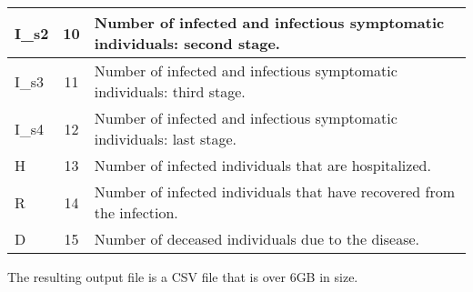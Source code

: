 \begin{table}[tb!]
{\begin{tabular}{|l|c|p{9.25cm}|}
            \hline
            I\_s2       & 10               & Number of infected and infectious symptomatic individuals: second stage.                                    \\
            \hline
            I\_s3       & 11               & Number of infected and infectious symptomatic individuals: third stage.                                     \\
            \hline
            I\_s4       & 12               & Number of infected and infectious symptomatic individuals: last stage.                                      \\
            \hline
            H           & 13               & Number of infected individuals that are hospitalized.                                                       \\
            \hline
            R           & 14               & Number of infected individuals that have recovered from the infection.                                      \\
            \hline
            D           & 15               & Number of deceased individuals due to the disease.                                                          \\
            \hline
        \end{tabular}%
    }
\end{table}

\begin{table}[tb!]
    \centering
    \caption{Description of output parameters.}
    \label{tab:outparams}
\end{table}

The resulting output file is a CSV file that is over 6GB in size.